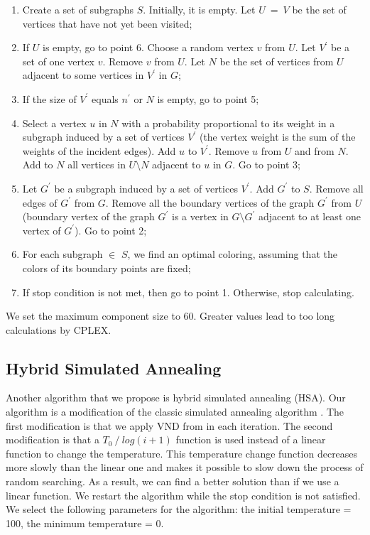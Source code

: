 \documentclass[runningheads]{llncs}
\begin{document}
\begin{enumerate}[itemsep=1em]

    \item Create a set of subgraphs $S$. Initially, it is empty. Let $U \: = \: V$ be the set of vertices that have not yet been visited;
    \item If $U$ is empty, go to point 6.
    Choose a random vertex $v$ from $U$.
    Let $V^{\prime}$ be a set of one vertex $v$. Remove $v$ from $U$. Let $N$ be the set of vertices from $U$ adjacent to some vertices in $V^{\prime}$ in $G$;
    \item If the size of $V^{\prime}$ equals $n^{\prime}$ or $N$ is empty, go to point 5;
    \item Select a vertex $u$ in $N$ with a probability proportional to its weight in a subgraph induced by a set of vertices $V^{\prime}$ (the vertex weight is the sum of the weights of the incident edges). Add $u$ to $V^{\prime}$. Remove $u$ from $U$ and from $N$. Add to $N$ all vertices in $U \setminus N$ adjacent to $u$ in $G$. Go to point 3;
    \item Let $G^{\prime}$ be a subgraph induced by a set of vertices $V^{\prime}$. Add $G^{\prime}$ to $S$. Remove all edges of $G^{\prime}$ from $G$. Remove all the boundary vertices of the graph $G^{\prime}$ from $U$ (boundary vertex of the graph $G^{\prime}$ is a vertex in $G \setminus G^{\prime}$ adjacent to at least one vertex of $G^{\prime}$). Go to point 2;
    \item For each subgraph $\in$ $S$, we find an optimal coloring, assuming that the colors of its boundary points are fixed;
	\item If stop condition is not met, then go to point 1. Otherwise, stop calculating.
\end{enumerate}

We set the maximum component size to 60. Greater values lead to too long calculations by CPLEX.

\subsection{Hybrid Simulated Annealing}
Another algorithm that we propose is hybrid simulated annealing (HSA). Our algorithm is a modification of the classic simulated annealing algorithm \cite{Kirkpatrick:83}. The first modification is that we apply VND from \cite{Erzin:24} in each iteration. The second modification is that a $T_{0} \: / \: log(i +1)$ function is used instead of a linear function to change the temperature. This temperature change function decreases more slowly than the linear one and makes it possible to slow down the process of random searching. As a result, we can find a better solution than if we use a linear function. We restart the algorithm while the stop condition is not satisfied. We select the following parameters for the algorithm: the initial temperature = 100, the minimum temperature = 0.\\
\end{document}
